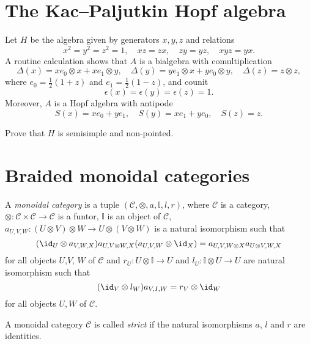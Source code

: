 \documentclass[12pt]{amsproc}
\begin{document}
\section{The Kac--Paljutkin Hopf algebra}

Let $H$ be the algebra given by generators 
$x,y,z$ and relations 
\[
x^2=y^2=z^2=1,\quad 
xz=zx,\quad 
zy=yz,\quad 
xyz=yx.
\]
A routine calculation shows that $A$ is a bialgebra 
with 
comultiplication 
\[
\Delta(x)=xe_0\otimes x+xe_1\otimes y,
\quad 
\Delta(y)=ye_1\otimes x+ye_0\otimes y,
\quad 
\Delta(z)=z\otimes z,
\]
where $e_0=\frac12(1+z)$ and $e_1=\frac12(1-z)$, and 
counit 
\[
\epsilon(x)=\epsilon(y)=\epsilon(z)=1.
\]
Moreover, $A$ is a Hopf algebra 
with antipode 
\[
S(x)=xe_0+ye_1,\quad 
S(y)=xe_1+ye_0,\quad 
S(z)=z.
\]

\begin{exercise}
\label{xca: KacPaljutkin}
    Prove that $H$
    is semisimple and non-pointed. 
\end{exercise}


\section{Braided monoidal categories}
\begin{definition}
A \emph{monoidal category} is a tuple
$(\mathcal{C},\otimes,a,\mathbb{I},l,r)$, where $\mathcal{C}$ is a category,
$\otimes:\mathcal{C}\times\mathcal{C}\to\mathcal{C}$ is a funtor, $\mathbb{I}$
is an object of $\mathcal{C}$, $a_{U,V,W}:(U\otimes V)\otimes W\to
U\otimes(V\otimes W)$ is a natural isomorphism such that 
\begin{equation}
(\id_{U}\otimes a_{V,W,X})a_{U,V\otimes W,X}(a_{U,V,W}\otimes\id_{X})=a_{U,V,W\otimes X}a_{U\otimes V,W,X}\label{eq:pentagon}
\end{equation}
for all objects $U$,$V$, $W$ of $\mathcal{C}$ and $r_{U}:U\otimes\mathbb{I}\to U$
and $l_{U}:\mathbb{I}\otimes U\to U$ are natural isomorphism such
that 
\begin{equation}
(\id_{V}\otimes l_{W})a_{V,I,W}=r_{V}\otimes\id_{W}\label{eq:triangles}
\end{equation}
for all objects $U,W$ of $\mathcal{C}$.
\end{definition}

\begin{definition}
A monoidal category $\mathcal{C}$ is called \emph{strict} if the natural
isomorphisms $a$, $l$ and $r$ are identities. 
\end{definition}
\end{document}
